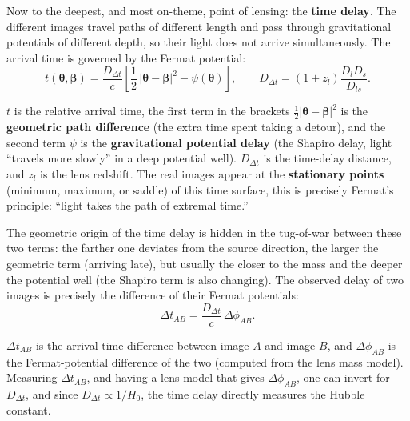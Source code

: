 Now to the deepest, and most on-theme, point of lensing: the \textbf{time delay}. The different images travel paths of different length and pass through gravitational potentials of different depth, so their light does not arrive simultaneously. The arrival time is governed by the Fermat potential:
\begin{equation}
  t({\boldsymbol\theta},{\boldsymbol\beta})
  =
  \frac{D_{\Delta t}}{c}
  \left[
  \frac{1}{2}\,|{\boldsymbol\theta}-{\boldsymbol\beta}|^2
  -
  \psi({\boldsymbol\theta})
  \right],
  \qquad
  D_{\Delta t}
  =
  (1+z_l)\frac{D_lD_s}{D_{ls}} .
  \label{eq:e21-fermat-delay}
\end{equation}
\begin{formulaexplain}
\(t\) is the relative arrival time, the first term in the brackets \(\tfrac12|{\boldsymbol\theta}-{\boldsymbol\beta}|^2\) is the \textbf{geometric path difference} (the extra time spent taking a detour), and the second term \(\psi\) is the \textbf{gravitational potential delay} (the Shapiro delay, light ``travels more slowly'' in a deep potential well). \(D_{\Delta t}\) is the time-delay distance, and \(z_l\) is the lens redshift. The real images appear at the \textbf{stationary points} (minimum, maximum, or saddle) of this time surface, this is precisely Fermat's principle: ``light takes the path of extremal time.''
\end{formulaexplain}
The geometric origin of the time delay is hidden in the tug-of-war between these two terms: the farther one deviates from the source direction, the larger the geometric term (arriving late), but usually the closer to the mass and the deeper the potential well (the Shapiro term is also changing). The observed delay of two images is precisely the difference of their Fermat potentials:
\begin{equation}
  \Delta t_{AB}
  =
  \frac{D_{\Delta t}}{c}\,
  \Delta\phi_{AB}.
  \label{eq:e21-time-delay-distance}
\end{equation}
\begin{formulaexplain}
\(\Delta t_{AB}\) is the arrival-time difference between image \(A\) and image \(B\), and \(\Delta\phi_{AB}\) is the Fermat-potential difference of the two (computed from the lens mass model). Measuring \(\Delta t_{AB}\), and having a lens model that gives \(\Delta\phi_{AB}\), one can invert for \(D_{\Delta t}\), and since \(D_{\Delta t}\propto 1/H_0\), the time delay directly measures the Hubble constant.
\end{formulaexplain}

